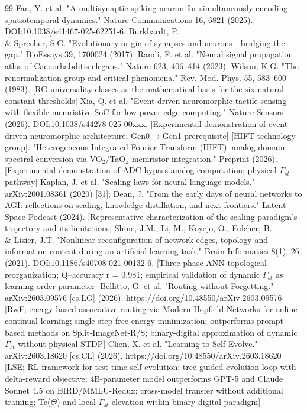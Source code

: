 \documentclass[a4paper,12pt]{article}
\providecommand{\textsubscript}[1]{\ensuremath{_{\text{#1}}}}
\begin{document}
\begin{thebibliography}{99}
 Fan, Y. et al. "A multisynaptic spiking neuron for simultaneously encoding spatiotemporal dynamics." Nature Communications 16, 6821 (2025). DOI:10.1038/s41467-025-62251-6.
 Burkhardt, P. \\& Sprecher, S.G. "Evolutionary origin of synapses and neurons---bridging the gap." BioEssays 39, 1700024 (2017); Randi, F. et al. "Neural signal propagation atlas of Caenorhabditis elegans." Nature 623, 406--414 (2023).
 Wilson, K.G. "The renormalization group and critical phenomena." Rev. Mod. Phys. 55, 583--600 (1983). [RG universality classes as the mathematical basis for the six natural-constant thresholds]
 Xia, Q. et al. "Event-driven neuromorphic tactile sensing with flexible memristive SoC for low-power edge computing." Nature Sensors (2026). DOI:10.1038/s44278-025-00xxx. [Experimental demonstration of event-driven neuromorphic architecture; Gen0$\rightarrow$Gen1 prerequisite]
 [HIFT technology group]. "Heterogeneous-Integrated Fourier Transform (HIFT): analog-domain spectral conversion via VO\textsubscript{2}/TaO\textsubscript{x} memristor integration." Preprint (2026). [Experimental demonstration of ADC-bypass analog computation; physical $\Gamma_{st}$ pathway]
 Kaplan, J. et al. "Scaling laws for neural language models." arXiv:2001.08361 (2020) [31]; Dean, J. "From the early days of neural networks to AGI: reflections on scaling, knowledge distillation, and next frontiers." Latent Space Podcast (2024). [Representative characterization of the scaling paradigm's trajectory and its limitations]
 Shine, J.M., Li, M., Koyejo, O., Fulcher, B. \\& Lizier, J.T. "Nonlinear reconfiguration of network edges, topology and information content during an artificial learning task." Brain Informatics 8(1), 26 (2021). DOI:10.1186/s40708-021-00132-6. [Three-phase ANN topological reorganization; Q--accuracy r = 0.981; empirical validation of dynamic $\Gamma_{st}$ as learning order parameter]
 Bellitto, G. et al. "Routing without Forgetting." arXiv:2603.09576 [cs.LG] (2026). https://doi.org/10.48550/arXiv.2603.09576 [RwF; energy-based associative routing via Modern Hopfield Networks for online continual learning; single-step free-energy minimization; outperforms prompt-based methods on Split-ImageNet-R/S; binary-digital approximation of dynamic $\Gamma_{st}$ without physical STDP]
 Chen, X. et al. "Learning to Self-Evolve." arXiv:2603.18620 [cs.CL] (2026). https://doi.org/10.48550/arXiv.2603.18620 [LSE; RL framework for test-time self-evolution; tree-guided evolution loop with delta-reward objective; 4B-parameter model outperforms GPT-5 and Claude Sonnet 4.5 on BIRD/MMLU-Redux; cross-model transfer without additional training; Tc($\Theta$) and local $\Gamma_{st}$ elevation within binary-digital paradigm]

\end{thebibliography}
\end{document}
